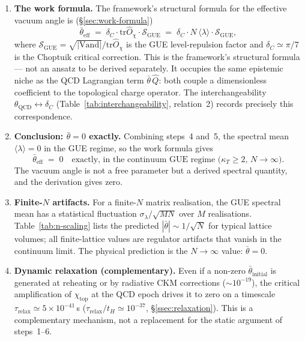 \documentclass[11pt,a4paper]{article}
\newcommand{\dC}{\delta_C}
\newcommand{\Opchi}{\hat{O}_\chi}
\providecommand{\tr}{}
\renewcommand{\tr}{\mathrm{tr}}
\theoremstyle{plain}
\theoremstyle{definition}
\theoremstyle{remark}
\begin{document}
\begin{enumerate}[leftmargin=2em,itemsep=4pt]
  \item \textbf{The work formula.}  The framework's structural formula
        for the effective vacuum angle is (\S\ref{sec:work-formula})
        \begin{equation}\label{eq:identify}
          \bar\theta_{\mathrm{eff}}
          \;=\; \dC \cdot \tr\Opchi \cdot \mathcal{S}_{\mathrm{GUE}}
          \;=\; \dC \cdot N\,\langle\lambda\rangle \cdot \mathcal{S}_{\mathrm{GUE}},
        \end{equation}
        where $\mathcal{S}_{\mathrm{GUE}} = \sqrt{|\mathrm{Vand}|}/\tr\Opchi$
        is the GUE level-repulsion factor and $\dC \simeq \pi/7$ is
        the Choptuik critical correction.  This is the framework's
        structural formula --- not an ansatz to be derived separately.
        It occupies the same epistemic niche as the QCD Lagrangian
        term $\bar\theta\,\hat Q$: both couple a dimensionless
        coefficient to the topological charge operator.  The
        interchangeability $\theta_{\mathrm{QCD}} \leftrightarrow \dC$
        (Table~\ref{tab:interchangeability}, relation~2) records
        precisely this correspondence.

  \item \textbf{Conclusion: $\bar\theta = 0$ exactly.}  Combining
        steps~4 and~5, the spectral mean $\langle\lambda\rangle = 0$
        in the GUE regime, so the work formula gives
        \begin{equation}\label{eq:theta-zero-chain}
          \boxed{\;\bar\theta_{\mathrm{eff}} \;=\; 0 \quad
          \text{exactly, in the continuum GUE regime
          ($\kappa_T \ge 2$, $N\to\infty$).}\;}
        \end{equation}
        The vacuum angle is not a free parameter but a derived
        spectral quantity, and the derivation gives zero.

  \item \textbf{Finite-$N$ artifacts.}  For a finite-$N$ matrix
        realisation, the GUE spectral mean has a statistical
        fluctuation $\sigma_\lambda/\sqrt{MN}$ over $M$ realisations.
        Table~\ref{tab:n-scaling} lists the predicted
        $|\bar\theta| \sim 1/\sqrt{N}$ for typical lattice volumes;
        all finite-lattice values are regulator artifacts that vanish
        in the continuum limit.  The physical prediction is the
        $N\to\infty$ value: $\bar\theta = 0$.

  \item \textbf{Dynamic relaxation (complementary).}  Even if a
        non-zero $\bar\theta_{\mathrm{initial}}$ is generated at
        reheating or by radiative CKM corrections
        ($\sim 10^{-19}$), the critical amplification of
        $\chi_{\mathrm{top}}$ at the QCD epoch drives it to zero on a
        timescale $\tau_{\mathrm{relax}} \simeq 5 \times 10^{-41}\,$s
        ($\tau_{\mathrm{relax}}/t_H \simeq 10^{-37}$,
        \S\ref{ssec:relaxation}).  This is a complementary mechanism,
        not a replacement for the static argument of steps~1--6.
\end{enumerate}
\end{document}
